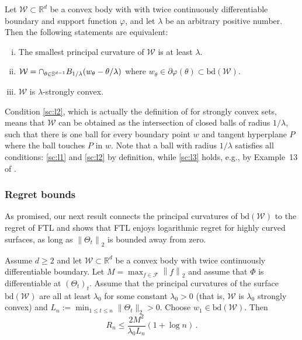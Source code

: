 \documentclass[english]{article}
\newcommand{\todoa}[2][]{\todo[color=Purple!20,size=\tiny,#1]{A: #2}}
\newcommand{\todor}[2][]{\todo[color=Blue!10,size=\tiny,#1]{R: #2}}
\newcommand{\cW}{\mathcal{W}}
\newcommand{\cF}{\mathcal{F}}
\newcommand{\R}{\mathbb{R}}
\newcommand{\bS}{\mathbb{S}}
\newcommand{\norm}[1]{\left\| #1 \right\|}
\newcommand{\bd}{\mathrm{bd}}
\begin{document}
\begin{proposition}
	\label{prop:strongconvex}
	Let $\cW \subset \R^d$ be a convex body with with twice continuously differentiable boundary and support function $\varphi$, %
	and let $\lambda$ be an arbitrary positive number.
	Then the following statements are equivalent:
	\begin{enumerate}[(i)]
		\item \label{sc:l1} The smallest principal curvature of $\cW$ is at least $\lambda$.
		\item \label{sc:l2} $\cW= {\large \cap}_{\theta \in \bS^{d-1} }{B_{1/\lambda} (w_\theta- \theta /\lambda)}$ where $w_\theta \in \partial \varphi(\theta) \subset \bd(\cW)$.
		\item \label{sc:l3} $\cW$ is $\lambda$-strongly convex.
	\end{enumerate}
\end{proposition}
Condition \eqref{sc:l2}, which is actually the definition of \citet{Pol96} for strongly convex sets, means that $\cW$ can be obtained as the intersection of closed balls of radius $1/\lambda$, such that there is one ball for every boundary point $w$ and  tangent hyperplane $P$ where the ball touches $P$ in $w$. Note that a ball with radius $1/\lambda$ satisfies all conditions: \eqref{sc:l1} and \eqref{sc:l2} by definition, while \eqref{sc:l3} holds, e.g., by Example~13 of \citet{JourneeNRS10}.


\subsubsection{Regret bounds}


As promised, our next result connects the principal curvatures of $\bd(\cW)$ to the regret of FTL
and shows that FTL enjoys logarithmic regret for highly curved surfaces, as long as $\norm{\Theta_t}_2$ 
is bounded away from zero.
\begin{theorem}
\label{thm:R_curvesurface}
Assume $d \ge 2$ and let $\cW\subset \R^d$ be a convex body with twice continuously differentiable boundary.
Let $M = \max_{f\in \cF} \norm{f}_2$ and assume that $\Phi$ is differentiable at $(\Theta_t)_{t}$.
Assume that the principal curvatures of the surface $\bd(\cW)$ 
are all at least $\lambda_0$ for some constant $\lambda_0>0$ (that is, $\cW$ is $\lambda_0$ strongly convex) and $L_n:=\min_{1\le t \le n} \|\Theta_t\|_2 >0$. 
Choose $w_1\in \bd(\cW)$.
Then
\[
R_n \le \frac{2M^2}{\lambda_0 L_n}(1+ \log n)\,.
\]
\end{theorem}
\end{document}
